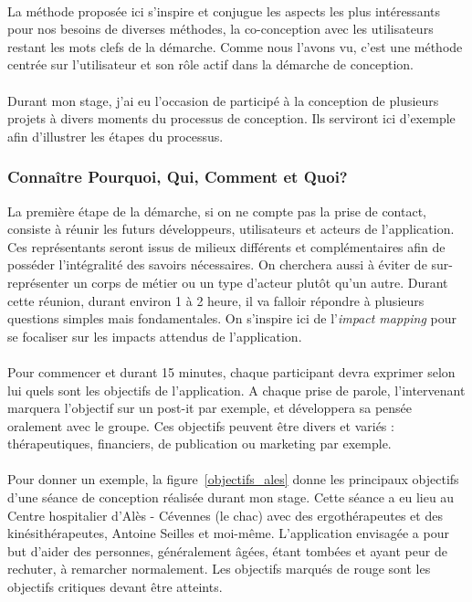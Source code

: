 \paragraph{} La méthode proposée ici s'inspire et conjugue les aspects les plus intéressants pour nos besoins de diverses  méthodes, la co-conception avec les utilisateurs restant les mots clefs de la démarche. Comme nous l'avons vu, c'est une méthode centrée sur l'utilisateur et son rôle actif dans la démarche de conception.

\paragraph{} Durant mon stage, j'ai eu l'occasion de participé à la conception de plusieurs projets à divers moments du processus de conception. Ils serviront ici d'exemple afin d'illustrer les étapes du processus.

	\subsubsection*{Connaître Pourquoi, Qui, Comment et Quoi?}
La première étape de la démarche, si on ne compte pas la prise de contact, consiste à réunir les futurs développeurs, utilisateurs et acteurs de l'application. Ces représentants seront issus de milieux différents et complémentaires afin de posséder l'intégralité des savoirs nécessaires. On cherchera aussi à éviter de sur-représenter un corps de métier ou un type d'acteur plutôt qu'un autre. Durant cette réunion, durant environ 1 à 2 heure, il va falloir répondre à plusieurs questions simples mais fondamentales. On s'inspire ici de l'\emph{impact mapping} pour se focaliser sur les impacts attendus de l'application.

\paragraph{}Pour commencer et durant 15 minutes, chaque participant devra exprimer selon lui quels sont les objectifs de l'application. A chaque prise de parole, l'intervenant marquera l'objectif sur un post-it par exemple, et développera sa pensée oralement avec le groupe. Ces objectifs peuvent être divers et variés : thérapeutiques, financiers, de publication ou marketing par exemple. 

\paragraph{} Pour donner un exemple, la figure~\ref{objectifs_ales} donne les principaux objectifs d'une séance de conception réalisée durant mon stage. Cette séance a eu lieu au Centre hospitalier d'Alès - Cévennes (le \gls{chac}) avec des ergothérapeutes et des kinésithérapeutes, Antoine Seilles et moi-même. L'application envisagée a pour but d'aider des personnes, généralement âgées, étant tombées et ayant peur de rechuter, à remarcher normalement. Les objectifs marqués de rouge sont les objectifs critiques devant être atteints.

